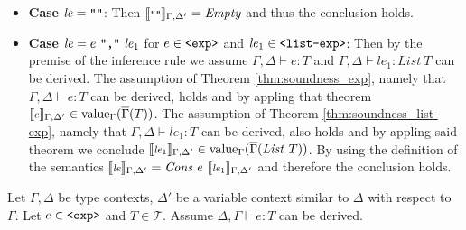 \documentclass[]{scrbook}
\newcommand{\mf}[1]{\text{\texttt{#1}}}
\newcommand{\semantic}[1]{\llbracket \text{\footnotesize\texttt{#1}} \rrbracket}
\theoremstyle{definition}
\theoremstyle{definition}
\theoremstyle{definition}
\theoremstyle{remark}
\begin{document}
\begin{itemize}
\item \textbf{Case} $\mathit{le} = \mf{""}$: Then \(\semantic{$\mf{""}$}_{\Gamma,\Delta'}=\mathit{Empty}\) and thus the conclusion holds.
\item \textbf{Case} $\mathit{le} = e \ \mf{","} \ \mathit{le}_1$ for $e\in\mf{<exp>}$ and $\mathit{le}_1\in\mf{<list-exp>}$: Then by the premise of the inference rule we assume $\Gamma,\Delta\vdash e:T$ and $\Gamma,\Delta\vdash \mathit{le}_1:\mathit{List} \ T$ can be derived. The assumption of Theorem \ref{thm:soundness_exp}, namely that $\Gamma,\Delta\vdash e:T$ can be derived, holds and by appling that theorem \(\semantic{$e$}_{\Gamma,\Delta'}\in\text{value}_\Gamma(\overline{\Gamma}(T))\). The assumption of Theorem \ref{thm:soundness_list-exp}, namely that $\Gamma,\Delta\vdash \mathit{le}_1:T$ can be derived, also holds and by appling said theorem we conclude \(\semantic{$\mathit{le}_1$}_{\Gamma,\Delta'}\in\text{value}_\Gamma(\overline{\Gamma}(\mathit{List} \ T))\). By using the definition of the semantics \(\semantic{$\mathit{le}$}_{\Gamma,\Delta'} = \mathit{Cons} \ e \ \semantic{$\mathit{le}_1$}_{\Gamma,\Delta'} \) and therefore the conclusion holds.
\end{itemize}

Let \(\Gamma,\Delta\) be type contexts, \(\Delta'\) be a variable
context similar to \(\Delta\) with respect to \(\Gamma\). Let
\(e\in\mf{<exp>}\) and \(T\in\mathcal{T}\). Assume
\(\Delta,\Gamma\vdash e:T\) can be derived.
\end{document}
